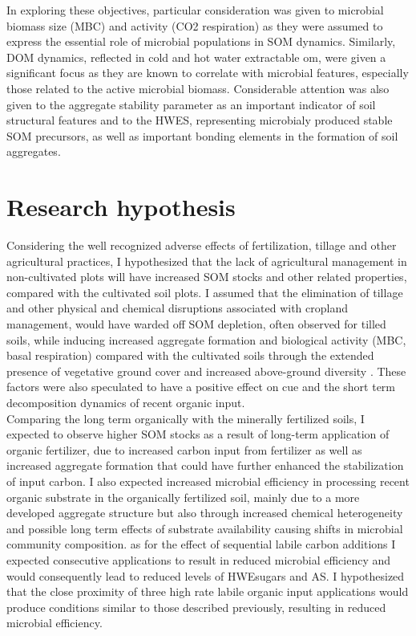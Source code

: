 \documentclass[12pt]{report}
\begin{document}
		In exploring these objectives, particular consideration was given to microbial biomass size (MBC)  and activity (CO2 respiration) as they were assumed to express the essential role of microbial populations in SOM dynamics. Similarly, DOM dynamics, reflected in cold and hot water extractable \gls{om}, were given a significant focus as they are known to correlate with microbial features, especially those related to the active microbial biomass.  Considerable attention was also given to the aggregate stability parameter as an important indicator of soil structural features and to the HWES, representing microbialy produced stable SOM precursors, as well as important bonding elements in the formation of soil aggregates.
		
		\section{Research hypothesis}
		Considering the well recognized adverse effects of fertilization, tillage and other agricultural practices, I hypothesized that the lack of agricultural management in non-cultivated plots will have increased SOM stocks and other related properties, compared with the cultivated soil plots. I assumed that the elimination of tillage and other physical and chemical disruptions associated with cropland management, would have warded off SOM depletion, often observed for tilled soils, while inducing increased aggregate formation and biological activity (MBC, basal respiration)  compared with the cultivated soils through the extended presence of vegetative ground cover and increased above-ground diversity . These factors were also speculated to have a positive effect on \gls{cue} and the short term decomposition dynamics of recent organic input.\\
		Comparing the long term organically with the minerally fertilized soils, I expected to observe higher SOM stocks as a result of long-term application of organic fertilizer, due to increased carbon input from fertilizer as well as increased aggregate formation that could have further enhanced the stabilization of input carbon.  I also expected increased microbial efficiency in processing recent organic substrate in the organically fertilized soil, mainly due to a more developed aggregate structure but also through increased chemical heterogeneity and possible long term effects of substrate availability causing shifts in microbial community composition.
		as for the effect of sequential labile carbon additions I expected consecutive applications to result in reduced microbial efficiency and would consequently lead to reduced levels of HWEsugars and AS.  I hypothesized that the close proximity of three high rate labile organic input applications would produce conditions similar to those described previously, resulting in reduced microbial efficiency.
	
\end{document}
